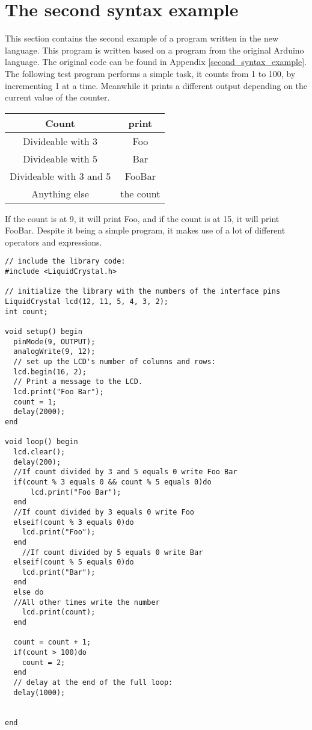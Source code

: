 \section{The second syntax example}
This section contains the second example of a program written in the new language. This program is written based on a program from the original Arduino language. The original code can be found in Appendix \ref{second_syntax_example}. The following test program performs a simple task,
it counts from 1 to 100, by incrementing 1 at a time. Meanwhile it prints a different output depending on the current value of the counter.\\
\begin{table}[H]
\centering
\begin{tabular}{|c|c|}
\hline 
Count & print \\ 
\hline 
Divideable with 3 & Foo \\ 
\hline 
Divideable with 5 & Bar \\ 
\hline 
Divideable with 3 and 5 & FooBar \\ 
\hline 
Anything else & the count \\ 
\hline 
\end{tabular} 
\end{table}

If the count is at 9, it will print Foo, and if the count is at 15, it will print FooBar. Despite it being a simple program, it makes use of a lot of different operators and expressions.

\begin{lstlisting}[caption=LCD code example based on the source language, label=lst:syntax2]
// include the library code:
#include <LiquidCrystal.h>

// initialize the library with the numbers of the interface pins
LiquidCrystal lcd(12, 11, 5, 4, 3, 2);
int count;

void setup() begin
  pinMode(9, OUTPUT);
  analogWrite(9, 12);
  // set up the LCD's number of columns and rows: 
  lcd.begin(16, 2);
  // Print a message to the LCD.
  lcd.print("Foo Bar");
  count = 1;
  delay(2000);
end

void loop() begin
  lcd.clear();
  delay(200);
  //If count divided by 3 and 5 equals 0 write Foo Bar
  if(count % 3 equals 0 && count % 5 equals 0)do
      lcd.print("Foo Bar"); 
  end
  //If count divided by 3 equals 0 write Foo 
  elseif(count % 3 equals 0)do
    lcd.print("Foo");
  end
    //If count divided by 5 equals 0 write Bar 
  elseif(count % 5 equals 0)do
    lcd.print("Bar");
  end
  else do
  //All other times write the number
    lcd.print(count);
  end
  
  count = count + 1;
  if(count > 100)do
    count = 2;
  end
  // delay at the end of the full loop:
  delay(1000);


end
\end{lstlisting}
